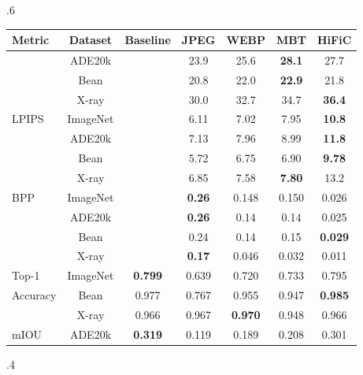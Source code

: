 \documentclass[10pt,twocolumn,letterpaper]{article}
\begin{document}
\begin{table*}[!htb]
    \caption{Comparing Compression \& Machine Perceptual Quality across Various Techniques}
    \label{tab:compression_comparison}
        \begin{subtable}{.6\linewidth}
      \centering
        \caption{Summary of Image Results}
        \label{tab:image_compression_comparison}
        \setlength{\tabcolsep}{3pt}
        {\small\begin{tabular}{lcccccc}
\toprule
Metric & Dataset & Baseline & JPEG & WEBP & MBT & HiFiC \\
\midrule
     & ADE20k &  & 23.9 & 25.6 & \textbf{28.1} & 27.7 \\
     & Bean &  & 20.8 & 22.0 & \textbf{22.9} & 21.8 \\
     & X-ray &  & 30.0 & 32.7 & 34.7 & \textbf{36.4} \\
\midrule
LPIPS & ImageNet &  & 6.11 & 7.02 & 7.95 & \textbf{10.8} \\
      & ADE20k &  & 7.13 & 7.96 & 8.99 & \textbf{11.8 }\\
      & Bean &  & 5.72 & 6.75 & 6.90 & \textbf{9.78} \\
      & X-ray &  & 6.85 & 7.58 & \textbf{7.80} & 13.2 \\
\midrule
BPP & ImageNet &  & \textbf{0.26} & 0.148 & 0.150 & 0.026 \\
    & ADE20k &  & \textbf{0.26} & 0.14 & 0.14 & 0.025 \\
    & Bean &  & 0.24 & 0.14 & 0.15 & \textbf{0.029} \\
    & X-ray &  & \textbf{0.17} & 0.046 & 0.032 & 0.011 \\
\midrule
Top-1 & ImageNet & \textbf{0.799} & 0.639 & 0.720 & 0.733 & 0.795 \\
 Accuracy                        & Bean & 0.977 & 0.767 & 0.955 & 0.947 &\textbf{ 0.985} \\
                        & X-ray & 0.966 & 0.967 & \textbf{0.970} & 0.948 & 0.966 \\
\midrule
mIOU & ADE20k & \textbf{0.319} & 0.119 & 0.189 & 0.208 & 0.301 \\
\bottomrule
\end{tabular}}
    \end{subtable} 
    \begin{subtable}{.4\linewidth}
      \centering
        \caption{Summary of Audio Results}
        \label{tab:audio_compression_comparison}
         \setlength{\tabcolsep}{3pt}
        {\small\begin{tabular}{lccccc}

\end{tabular}}
\end{subtable}
\end{table*}
\end{document}
